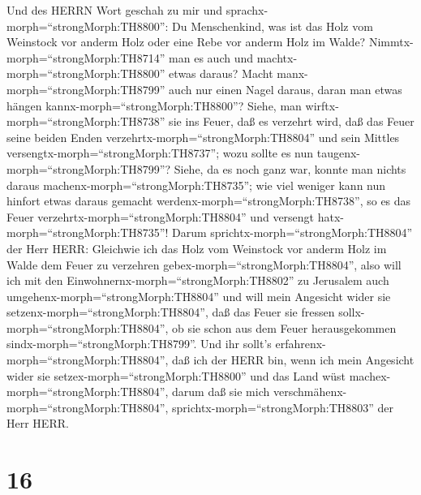  Und des HERRN Wort geschah zu mir und
sprachx-morph=``strongMorph:TH8800'':  Du Menschenkind, was
ist das Holz vom Weinstock vor anderm Holz oder eine Rebe vor anderm
Holz im Walde?  Nimmtx-morph=``strongMorph:TH8714'' man es
auch und machtx-morph=``strongMorph:TH8800'' etwas daraus? Macht
manx-morph=``strongMorph:TH8799'' auch nur einen Nagel daraus, daran man
etwas hängen kannx-morph=``strongMorph:TH8800''?  Siehe, man
wirftx-morph=``strongMorph:TH8738'' sie ins Feuer, daß es verzehrt wird,
daß das Feuer seine beiden Enden verzehrtx-morph=``strongMorph:TH8804''
und sein Mittles versengtx-morph=``strongMorph:TH8737''; wozu sollte es
nun taugenx-morph=``strongMorph:TH8799''?  Siehe, da es noch
ganz war, konnte man nichts daraus machenx-morph=``strongMorph:TH8735'';
wie viel weniger kann nun hinfort etwas daraus gemacht
werdenx-morph=``strongMorph:TH8738'', so es das Feuer
verzehrtx-morph=``strongMorph:TH8804'' und versengt
hatx-morph=``strongMorph:TH8735''!  Darum
sprichtx-morph=``strongMorph:TH8804'' der Herr HERR: Gleichwie ich das
Holz vom Weinstock vor anderm Holz im Walde dem Feuer zu verzehren
gebex-morph=``strongMorph:TH8804'', also will ich mit den
Einwohnernx-morph=``strongMorph:TH8802'' zu Jerusalem auch
umgehenx-morph=``strongMorph:TH8804''  und will mein
Angesicht wider sie setzenx-morph=``strongMorph:TH8804'', daß das Feuer
sie fressen sollx-morph=``strongMorph:TH8804'', ob sie schon aus dem
Feuer herausgekommen sindx-morph=``strongMorph:TH8799''. Und ihr sollt's
erfahrenx-morph=``strongMorph:TH8804'', daß ich der HERR bin, wenn ich
mein Angesicht wider sie setzex-morph=``strongMorph:TH8800''
 und das Land wüst machex-morph=``strongMorph:TH8804'',
darum daß sie mich verschmähenx-morph=``strongMorph:TH8804'',
sprichtx-morph=``strongMorph:TH8803'' der Herr HERR.

\hypertarget{section-15}{%
\section{16}\label{section-15}}

